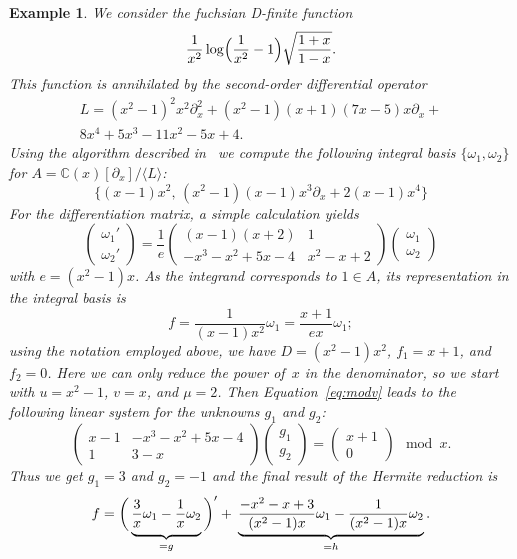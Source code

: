 \documentclass{sig-alternate}
\newtheorem{example}[theorem]{Example}
\def\<#1>{\langle#1\rangle}
\newcommand{\bC}{ {\mathbb C}}
\begin{document}
\begin{example}\label{ex:hr}
We consider the fuchsian D-finite function
\[
  \frac{1}{x^2} \log\Bigl(\frac{1}{x^2}-1\Bigr)\sqrt{\frac{1+x}{1-x}}.
\]
This function is annihilated by the second-order differential operator
\begin{multline*}
  L = (x^2-1)^2 x^2 \partial_x^2 + (x^2-1) (x+1) (7x-5) x \partial_x + {}\\
    8x^4+5x^3-11x^2-5x+4.
\end{multline*}
Using the algorithm described in~\cite{kauers15b} we compute the following
integral basis $\{\omega_1,\omega_2\}$ for $A=\bC(x)[\partial_x]/\<L>$:
\[
  \bigl\{ (x-1) x^2,\, (x^2-1) (x-1) x^3 \partial_x + 2(x-1) x^4 \bigr\}
\]
For the differentiation matrix, a simple calculation yields
\begin{equation}\label{eq:dmat}
  \begin{pmatrix} \omega_1' \\[2pt] \omega_2' \end{pmatrix} =
  \frac{1}{e} \begin{pmatrix} (x-1) (x+2) & 1 \\[2pt] -x^3-x^2+5x-4 & x^2-x+2 \end{pmatrix}
  \begin{pmatrix} \omega_1 \\[2pt] \omega_2 \end{pmatrix}
\end{equation}
with $e=(x^2-1)x$. As the integrand corresponds to $1\in A$, its
representation in the integral basis is
\[
  f = \frac{1}{(x-1)x^2} \omega_1 = \frac{x+1}{ex} \omega_1;
\]
using the notation employed above, we have $D=(x^2-1)x^2$, $f_1=x+1$,
and $f_2=0$. Here we can only reduce the power of~$x$ in the denominator, so
we start with $u=x^2-1$, $v=x$, and $\mu=2$. Then Equation~\eqref{eq:modv} leads
to the following linear system for the unknowns $g_1$ and $g_2$:
\[
  \begin{pmatrix} x-1 & -x^3-x^2+5 x-4 \\ 1 & 3-x \end{pmatrix}
  \begin{pmatrix} g_1 \\ g_2 \end{pmatrix} =
  \begin{pmatrix} x+1 \\ 0 \end{pmatrix} \mod x.
\]
Thus we get $g_1=3$ and $g_2=-1$ and the final result of the Hermite reduction is
\[
f=
  \biggl(\, \underbrace{\vphantom{\frac{1}{(x)}}  \frac{3}{x} \omega_1 - \frac{1}{x} \omega_2}_{=g} \,\biggr)' +\>
  \underbrace{\frac{-x^2-x+3}{(x^2-1)x} \omega_1 - \frac{1}{(x^2-1)x} \omega_2}_{=h}.
\]
\end{example}
\end{document}
